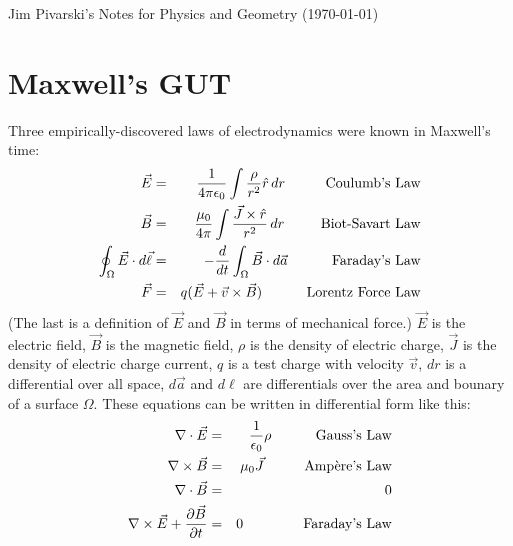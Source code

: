 \documentclass[12pt]{article}
\begin{document}
\begin{flushright}
Jim Pivarski's Notes for Physics and Geometry (\today)
\end{flushright}

\section{Maxwell's GUT}

Three empirically-discovered laws of electrodynamics were known in
Maxwell's time:
\begin{eqnarray}
  \vec{E} &=& \displaystyle \frac{1}{4\pi\epsilon_0} \int \frac{\rho}{r^2} \hat{r} \, dr \mbox{\hspace{0.9 cm} Coulumb's Law} \\
  \vec{B} &=& \displaystyle \frac{\mu_0}{4\pi} \int \frac{\vec{J}\times \hat{r}}{r^2} \, dr \mbox{\hspace{0.8 cm} Biot-Savart Law} \\
  \displaystyle \oint_\Omega \vec{E} \cdot d\vec{\ell} &=& \displaystyle -\frac{d}{dt} \int_\Omega \vec{B} \cdot d\vec{a} \mbox{\hspace{1 cm} Faraday's Law} \\
  \vec{F} &=& \displaystyle q(\vec{E} + \vec{v} \times \vec{B}) \mbox{\hspace{1 cm} Lorentz Force Law}
\end{eqnarray}
(The last is a definition of $\vec{E}$ and $\vec{B}$ in terms of
mechanical force.)  $\vec{E}$ is the electric field, $\vec{B}$ is the
magnetic field, $\rho$ is the density of electric charge, $\vec{J}$ is
the density of electric charge current, $q$ is a test charge with
velocity $\vec{v}$, $dr$ is a differential over all space, $d\vec{a}$
and $d\ell$ are differentials over the area and bounary of a surface
$\Omega$.  These equations can be written in differential form like
this:
\begin{eqnarray}
  \nabla \cdot \vec{E} &=& \displaystyle \frac{1}{\epsilon_0} \rho \mbox{\hspace{1 cm} Gauss's Law} \\
  \nabla \times \vec{B} &=& \mu_0 \vec{J} \mbox{\hspace{0.9 cm} Amp\`ere's Law} \\
  \nabla \cdot \vec{B} &=& 0 \\
  \displaystyle \nabla \times \vec{E} + \frac{\partial \vec{B}}{\partial t} &=& 0 \mbox{\hspace{1.4 cm} Faraday's Law}
\end{eqnarray}
\end{document}
